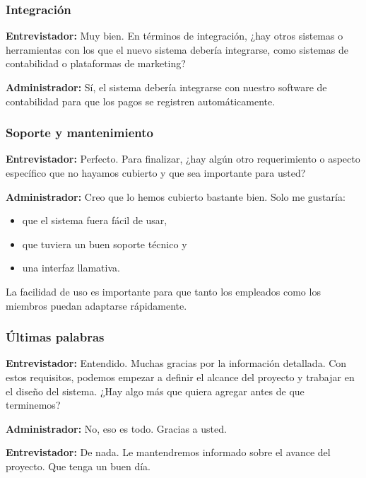 \documentclass[spanish,12pt]{article}
\providecommand{\tightlist}{\setlength{\itemsep}{0pt}\setlength{\parskip}{0pt}}
\begin{document}
\subsubsection{Integración}\label{integraciuxf3n}

\textbf{Entrevistador:} Muy bien. En términos de integración, ¿hay otros
sistemas o herramientas con los que el nuevo sistema debería integrarse,
como sistemas de contabilidad o plataformas de marketing?

\textbf{Administrador:} Sí, el sistema debería integrarse con nuestro
software de contabilidad para que los pagos se registren
automáticamente.

\subsubsection{Soporte y mantenimiento}\label{soporte-y-mantenimiento}

\textbf{Entrevistador:} Perfecto. Para finalizar, ¿hay algún otro
requerimiento o aspecto específico que no hayamos cubierto y que sea
importante para usted?

\textbf{Administrador:} Creo que lo hemos cubierto bastante bien. Solo
me gustaría:

\begin{itemize}
\tightlist
\item
  que el sistema fuera fácil de usar,
\item
  que tuviera un buen soporte técnico y
\item
  una interfaz llamativa.
\end{itemize}

La facilidad de uso es importante para que tanto los empleados como los
miembros puedan adaptarse rápidamente.

\subsubsection{Últimas palabras}\label{uxfaltimas-palabras}

\textbf{Entrevistador:} Entendido. Muchas gracias por la información
detallada. Con estos requisitos, podemos empezar a definir el alcance
del proyecto y trabajar en el diseño del sistema. ¿Hay algo más que
quiera agregar antes de que terminemos?

\textbf{Administrador:} No, eso es todo. Gracias a usted.

\textbf{Entrevistador:} De nada. Le mantendremos informado sobre el
avance del proyecto. Que tenga un buen día.
\end{document}
